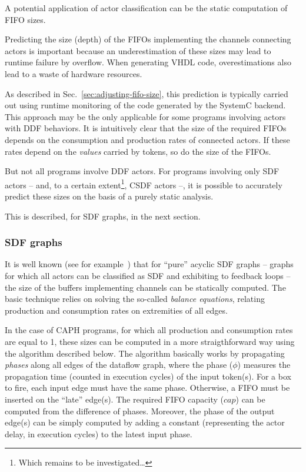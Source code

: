 
A potential application of actor classification can be the static computation of FIFO sizes.

Predicting the size (depth) of the FIFOs implementing the channels connecting actors is important
because an underestimation of these sizes may lead to runtime failure by overflow. When generating
VHDL code, overestimations also lead to a waste of hardware resources.

As described in Sec.~\ref{sec:adjusting-fifo-size}, this prediction is typically carried out using
runtime monitoring of the code generated by the SystemC backend. This approach may be the only
applicable for some programs involving actors with DDF behaviors. It is intuitively clear that the
size of the required FIFOs depends on the consumption and production rates of connected actors. If
these rates depend on the \emph{values} carried by tokens, so do the size of the FIFOs.

But not all programs involve DDF actors. For programs involving only SDF actors -- and, to a certain
extent\footnote{Which remains to be investigated\ldots}, CSDF actors --, it is possible to
accurately predict these sizes on the basis of a purely static analysis.

This is described, for SDF graphs, in the next section.

\subsubsection{SDF graphs}
\label{sec:sdf-fifo-sizing}

It is well known (see for example~\cite{Parks1995}) that for ``pure'' acyclic SDF graphs -- \ie
graphs for which all actors can be classified as SDF and exhibiting to feedback loops -- the size of
the buffers implementing channels can be statically computed. The basic technique relies on solving
the so-called \emph{balance equations}, relating production and consumption rates on extremities of
all edges.

\medskip In the case of CAPH programs, for which all production and consumption rates are equal to
1, these sizes can be computed in a more straigthforward way using the algorithm described below.
The algorithm basically works by propagating \emph{phases} along all edges of the dataflow graph, where
the phase ($\phi$) measures the propagation time (counted in execution cycles) of the input
token(s).  For a box to fire, each input edge must have the same phase. Otherwise, a FIFO must be
inserted on the ``late'' edge(s). The required FIFO capacity ($cap$) can be computed from the difference of
phases. Moreover, the phase of the output edge(s) can be simply computed by adding a constant
(representing the actor delay, in execution cycles) to the latest input phase.  

